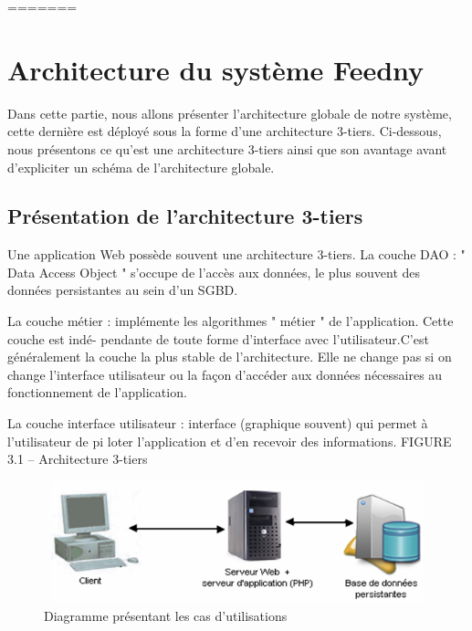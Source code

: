 




=======
\section{Architecture du système \textquotedbl Feedny\textquotedbl}
Dans cette partie, nous allons présenter l'architecture globale de notre système, cette dernière est déployé sous la forme d'une architecture 3-tiers. Ci-dessous, nous présentons ce qu'est une architecture 3-tiers ainsi que son avantage avant d'expliciter un schéma de l'architecture globale.

\subsection{Présentation de l’architecture 3-tiers}
Une application Web possède souvent une architecture 3-tiers.
La couche DAO : " Data Access Object " s’occupe de l’accès aux données, le plus souvent des
données persistantes au sein d’un SGBD.

La couche métier : implémente les algorithmes " métier " de l’application. Cette couche est indé-
pendante de toute forme d’interface avec l’utilisateur.C’est généralement la couche la plus
stable de l’architecture. Elle ne change pas si on change l’interface utilisateur ou la façon
d’accéder aux données nécessaires au fonctionnement de l’application.

La couche interface utilisateur : interface (graphique souvent) qui permet à l’utilisateur de pi
loter l’application et d’en recevoir des informations.
FIGURE 3.1 – Architecture 3-tiers

\begin{figure}[H]
    \centering
    \includegraphics[height=100pt,width=400pt]{img/chapter3/tiers.png}
    \caption{Diagramme présentant les cas d'utilisations}
\end{figure}

